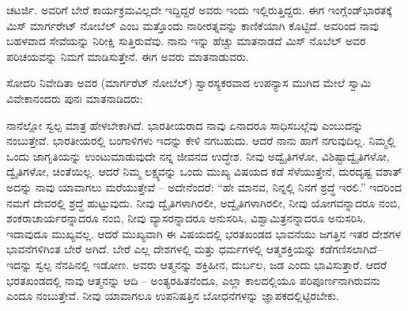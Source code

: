 ಚಟರ್ಜಿ. ಅವರಿಗೆ ಬೇರೆ ಕಾರ್ಯಕ್ರಮವಿಲ್ಲದೇ ಇದ್ದಿದ್ದರೆ ಅವರು ಇಂದು ಇಲ್ಲಿರುತ್ತಿದ್ದರು. ಈಗ ಇಂಗ್ಲೆಂಡ್​ ಭಾರತಕ್ಕೆ ಮಿಸ್​ ಮಾರ್ಗರೇಟ್​ ನೋಬೆಲ್​ ಎಂಬ ಮತ್ತೊಂದು ನಾರೀರತ್ನವನ್ನು ಕಾಣಿಕೆಯಾಗಿ ಕೊಟ್ಟಿದೆ. ಅವರಿಂದ ನಾವು ಬಹಳವಾದ ಸೇವೆಯನ್ನು ನಿರೀಕ್ಷಿ ಸುತ್ತಿರುವೆವು. ನಾನು ಇನ್ನು ಹೆಚ್ಚು ಮಾತನಾಡದೆ ಮಿಸ್​ ನೊಬೆಲ್​ ಅವರ ಪರಿಚಯವನ್ನು ನಿಮಗೆ ಮಾಡಿಸುತ್ತೇನೆ. ಈಗ ಅವರು ಮಾತನಾಡುವರು. 

ಸೋದರಿ ನಿವೇದಿತಾ ಅವರ (ಮಾರ್ಗರೆಟ್​ ನೋಬೆಲ್​) ಸ್ವಾರಸ್ಯಕರವಾದ ಉಪನ್ಯಾಸ ಮುಗಿದ ಮೇಲೆ ಸ್ವಾಮಿ ವಿವೇಕಾನಂದರು ಪುನಃ ಮಾತನಾಡಿದರು:

ನಾನೆಲ್ಲೋ ಸ್ವಲ್ಪ ಮಾತ್ರ ಹೇಳಬೇಕಾಗಿದೆ. ಭಾರತೀಯರಾದ ನಾವು ಏನಾದರೂ ಸಾಧಿಸಬಲ್ಲೆವು ಎಂಬುದನ್ನು ನಂಬುತ್ತೇವೆ. ಭಾರತೀಯರಲ್ಲಿ ಬಂಗಾಳಿಗಳು ಇದನ್ನು ಕೇಳಿ ನಗಬಹುದು. ಆದರೆ ನಾನು ಹಾಗೆ ನಗುವುದಿಲ್ಲ. ನಿಮ್ಮಲ್ಲಿ ಒಂದು ಜಾಗೃತಿಯನ್ನು ಉಂಟುಮಾಡುವುದೇ ನನ್ನ ಜೀವನದ ಉದ್ಧೇಶ. ನೀವು ಅದ್ವೈತಿಗಳೋ, ವಿಶಿಷ್ಟಾದ್ವೈತಿಗಳೋ, ದ್ವೈತಿಗಳೋ, ಚಿಂತೆಯಿಲ್ಲ. ಆದರೆ ನಿಮ್ಮ ಲಕ್ಷ್ಯವನ್ನು ಒಂದು ಮುಖ್ಯ ವಿಷಯದ ಕಡೆ ಸೆಳೆಯುತ್ತೇನೆ, ದುರದೃಷ್ಟ ವಶಾತ್​ ಅದನ್ನು ನಾವು ಯಾವಾಗಲು ಮರೆಯುತ್ತೇವೆ – ಅದೇನೆಂದರೆ: “ಹೇ ಮಾನವ, ನಿನ್ನಲ್ಲಿ ನಿನಗೆ ಶ್ರದ್ಧೆ ಇರಲಿ.” ಇದರಿಂದ ನಮಗೆ ದೇವರಲ್ಲಿ ಶ್ರದ್ಧೆ ಹುಟ್ಟುವುದು. ನೀವು ದ್ವೈತಿಗಳಾಗಿರಲೀ, ಅದ್ವೈತಿಗಳಾಗಿರಲೀ, ನೀವು ಯೋಗವನ್ನಾದರೂ ನಂಬಿ, ಶಂಕರಾಚಾರ್ಯರನ್ನಾದರೂ ನಂಬಿ, ನೀವು ವ್ಯಾಸರನ್ನಾದರೂ ಅನುಸರಿಸಿ, ವಿಶ್ವಾಮಿತ್ರನನ್ನಾದರೂ ಅನುಸರಿಸಿ. ಇದಾವುದೂ ಮುಖ್ಯವಲ್ಲ. ಆದರೆ ಮುಖ್ಯವಾಗಿ ಈ ವಿಷಯದಲ್ಲಿ ಭರತಖಂಡದ ಭಾವನೆಯು ಜಗತ್ತಿನ ಇತರ ದೇಶಗಳ ಭಾವನೆಗಳಿಗಿಂತ ಬೇರೆ ಅಗಿದೆ. ಬೇರೆ ಎಲ್ಲ ದೇಶಗಳಲ್ಲಿ ಮತ್ತು ಧರ್ಮಗಳಲ್ಲಿ ಆತ್ಮಶಕ್ತಿಯನ್ನು ಕಡೆಗಣಿಸಲಾಗಿದೆ–ಇದನ್ನು ಸ್ವಲ್ಪ ನೆನಪಿನಲ್ಲಿ ಇಡೋಣ. ಅವರು ಆತ್ಮನನ್ನು ಶಕ್ತಿಹೀನ, ದುರ್ಬಲ, ಜಡ ಎಂದು ಭಾವಿಸುತ್ತಾರೆ. ಆದರೆ ಭರತಖಂಡದಲ್ಲಿ ನಾವು ಆತ್ಮನನ್ನು ಆದಿ – ಅಂತ್ಯರಹಿತನೆಂದೂ, ಎಲ್ಲಾ ಕಾಲದಲ್ಲಿಯೂ ಪರಿಪೂರ್ಣನಾಗಿರುವನು ಎಂದೂ ನಂಬುತ್ತೇವೆ. ನೀವು ಯಾವಾಗಲೂ ಉಪನಿಷತ್ತಿನ ಬೋಧನೆಗಳನ್ನು ಜ್ಞಾಪಕದಲ್ಲಿಟ್ಟಿರಬೇಕು. 


